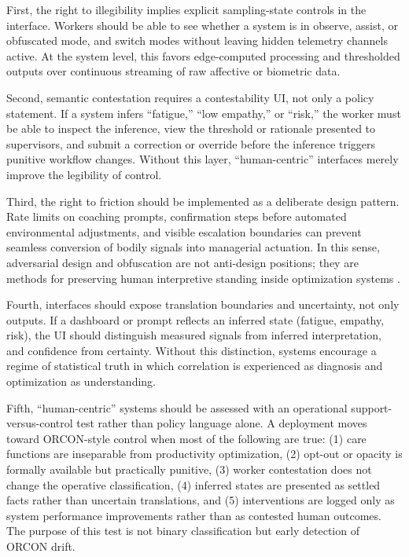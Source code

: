 \documentclass[runningheads]{llncs}
\begin{document}
First, the right to illegibility implies explicit sampling-state controls in the interface. Workers should be able to see whether a system is in observe, assist, or obfuscated mode, and switch modes without leaving hidden telemetry channels active. At the system level, this favors edge-computed processing and thresholded outputs over continuous streaming of raw affective or biometric data.

Second, semantic contestation requires a contestability UI, not only a policy statement. If a system infers ``fatigue,'' ``low empathy,'' or ``risk,'' the worker must be able to inspect the inference, view the threshold or rationale presented to supervisors, and submit a correction or override before the inference triggers punitive workflow changes. Without this layer, ``human-centric'' interfaces merely improve the legibility of control.

Third, the right to friction should be implemented as a deliberate design pattern. Rate limits on coaching prompts, confirmation steps before automated environmental adjustments, and visible escalation boundaries can prevent seamless conversion of bodily signals into managerial actuation. In this sense, adversarial design and obfuscation are not anti-design positions; they are methods for preserving human interpretive standing inside optimization systems \cite{disalvo2012adversarial,nissenbaum2015obfuscation}.

Fourth, interfaces should expose translation boundaries and uncertainty, not only outputs. If a dashboard or prompt reflects an inferred state (fatigue, empathy, risk), the UI should distinguish measured signals from inferred interpretation, and confidence from certainty. Without this distinction, systems encourage a regime of statistical truth in which correlation is experienced as diagnosis and optimization as understanding.

Fifth, ``human-centric'' systems should be assessed with an operational support-versus-control test rather than policy language alone. A deployment moves toward ORCON-style control when most of the following are true: (1) care functions are inseparable from productivity optimization, (2) opt-out or opacity is formally available but practically punitive, (3) worker contestation does not change the operative classification, (4) inferred states are presented as settled facts rather than uncertain translations, and (5) interventions are logged only as system performance improvements rather than as contested human outcomes. The purpose of this test is not binary classification but early detection of ORCON drift.
\end{document}
